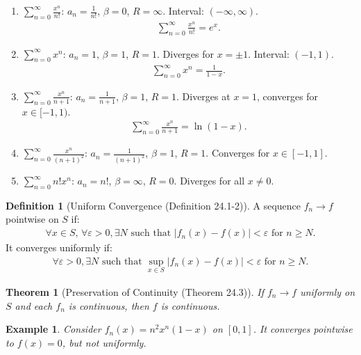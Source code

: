 \documentclass[7pt]{article}
\theoremstyle{definition}
\newtheorem{definition}{Definition}
\theoremstyle{plain}
\newtheorem{theorem}{Theorem}
\newtheorem{example}{Example}
\begin{document}
\begin{enumerate}
    \item $ \sum_{n=0}^\infty \frac{x^n}{n!} $: $ a_n = \frac{1}{n!} $, $ \beta = 0 $, $ R = \infty $. Interval: $ (-\infty, \infty) $.
    \begin{align}
    \sum_{n=0}^\infty \frac{x^n}{n!} = e^x.
    \end{align}
    \item $ \sum_{n=0}^\infty x^n $: $ a_n = 1 $, $ \beta = 1 $, $ R = 1 $. Diverges for $ x = \pm 1 $. Interval: $ (-1, 1) $.
    \begin{align}
    \sum_{n=0}^\infty x^n = \frac{1}{1-x}.
    \end{align}
    \item $ \sum_{n=0}^\infty \frac{x^n}{n+1} $: $ a_n = \frac{1}{n+1} $, $ \beta = 1 $, $ R = 1 $. Diverges at $ x = 1 $, converges for $ x \in [-1, 1) $.
    \begin{align}
    \sum_{n=0}^\infty \frac{x^n}{n+1} = \ln(1-x).
    \end{align}
    \item $ \sum_{n=0}^\infty \frac{x^n}{(n+1)^2} $: $ a_n = \frac{1}{(n+1)^2} $, $ \beta = 1 $, $ R = 1 $. Converges for $ x \in [-1, 1] $.
    \item $ \sum_{n=0}^\infty n! x^n $: $ a_n = n! $, $ \beta = \infty $, $ R = 0 $. Diverges for all $ x \neq 0 $.
\end{enumerate}

\begin{definition}[Uniform Convergence (Definition 24.1-2)]
A sequence $ f_n \to f $ pointwise on $ S $ if:
\begin{align}
\forall x \in S, \, \forall \varepsilon > 0, \exists N \text{ such that } |f_n(x) - f(x)| < \varepsilon \text{ for } n \geq N.
\end{align}
It converges uniformly if:
\begin{align}
\forall \varepsilon > 0, \exists N \text{ such that } \sup_{x \in S} |f_n(x) - f(x)| < \varepsilon \text{ for } n \geq N.
\end{align}
\end{definition}

\begin{theorem}[Preservation of Continuity (Theorem 24.3)]
If $ f_n \to f $ uniformly on $ S $ and each $ f_n $ is continuous, then $ f $ is continuous.
\end{theorem}

\begin{example}
Consider $ f_n(x) = n^2 x^n (1-x) $ on $ [0, 1] $. It converges pointwise to $ f(x) = 0 $, but not uniformly.
\end{example}
\end{document}
